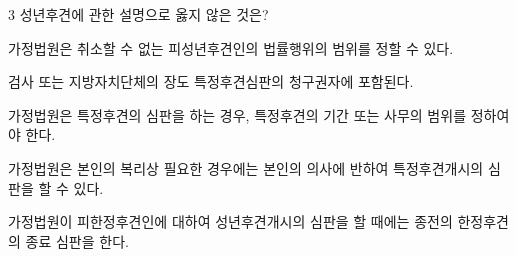 \begin{question}{3}
성년후견에 관한 설명으로 옳지 않은 것은?
\begin{choices}
  \item 가정법원은 취소할 수 없는 피성년후견인의 법률행위의 범위를 정할 수 있다.
  \item 검사 또는 지방자치단체의 장도 특정후견심판의 청구권자에 포함된다.
  \item 가정법원은 특정후견의 심판을 하는 경우, 특정후견의 기간 또는 사무의 범위를 정하여야 한다.
  \item 가정법원은 본인의 복리상 필요한 경우에는 본인의 의사에 반하여 특정후견개시의 심판을 할 수 있다.
  \item 가정법원이 피한정후견인에 대하여 성년후견개시의 심판을 할 때에는 종전의 한정후견의 종료 심판을 한다.
\end{choices}
\end{question}
